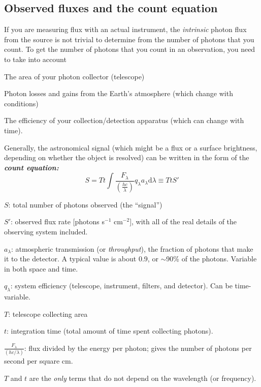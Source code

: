 \documentclass[12pt]{article}
\begin{document}
\subsection*{Observed fluxes and the count equation}
If you are measuring flux with an actual instrument,
the \emph{intrinsic} photon flux from the source is not
trivial to determine from the number of photons that you count.
To get the number of photons that you count in an observation,
you need to take into account
\begin{itemize*}
    \item The area of your photon collector (telescope)
    \item Photon losses and gains from the Earth's atmosphere
    (which change with conditions)
    \item The efficiency of your collection/detection
    apparatus (which can change with time).
\end{itemize*}
Generally, the astronomical signal (which might be a flux or a
surface brightness, depending on whether the object is resolved)
can be written in the form of the \emph{\textbf{count equation:}}
    $$ S = Tt \int \frac{F_{\lambda}}
    {\left(\frac{hc}{\lambda}\right)}q_{\lambda}
    a_{\lambda}\textrm{d}\lambda \equiv TtS' $$
    \begin{itemize*}
        \item $S$: total number of photons observed (the ``signal'')
        \item $S'$: observed flux rate [photons s$^{-1}$ cm$^{-2}$],
            with all of the real details of the observing system included.
        \item $a_{\lambda}$: atmospheric transmission
            (or \emph{throughput}), the fraction of photons that
            make it to the detector.
            A typical value is about 0.9, or $\sim$90\% of the photons.
            Variable in both space and time.
        \item $q_{\lambda}$: system efficiency
            (telescope, instrument, filters, and detector). Can be
            time-variable.
        \item $T$: telescope collecting area
        \item $t$: integration time
            (total amount of time spent collecting photons).
        \item $\frac{F_{\lambda}}{\left(hc/\lambda\right)}$:
            flux divided by the energy per photon;
            gives the number of photons per second per square cm.
    \end{itemize*}
$T$ and $t$ are the \emph{only} terms that do not depend on
the wavelength (or frequency).
\end{document}
